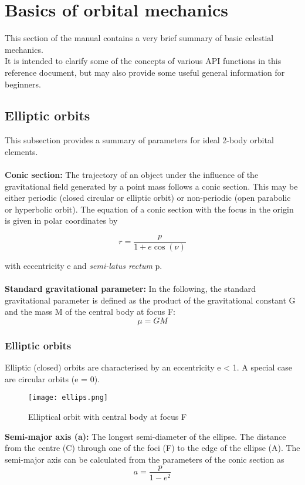 \documentclass[Orbiter Developer Manual.tex]{subfiles}
\begin{document}
\section{Basics of orbital mechanics}
This section of the manual contains a very brief summary of basic celestial mechanics.\\
It is intended to clarify some of the concepts of various API functions in this reference document, but may also provide some useful general information for beginners.


\subsection{Elliptic orbits}%
This subsection provides a summary of parameters for ideal 2-body orbital elements.\\
\\
\textbf{Conic section:} The trajectory of an object under the influence of the gravitational field generated by a point mass follows a conic section. This may be either periodic (closed circular or elliptic orbit) or non-periodic (open parabolic or hyperbolic orbit). The equation of a conic section with the focus in the origin is given in polar coordinates by

\[ r = \frac{p}{1+e \cos(\nu)} \]

\noindent
with eccentricity e and \textit{semi-latus rectum} p.\\
\\
\textbf{Standard gravitational parameter:} In the following, the standard gravitational parameter is defined as the product of the gravitational constant G and the mass M of the central body at focus F:
\[ \mu = GM \]


\subsubsection{Elliptic orbits}%
Elliptic (closed) orbits are characterised by an eccentricity e < 1. A special case are circular orbits (e = 0).

\begin{figure}[H]
  \centering
  \texttt{[image: ellips.png]}
  \caption{Elliptical orbit with central body at focus F}
\end{figure}

\noindent
\textbf{Semi-major axis (a):} The longest semi-diameter of the ellipse. The distance from the centre (C) through one of the foci (F) to the edge of the ellipse (A). The semi-major axis can be calculated from the parameters of the conic section as
\[ a = \frac{p}{1-e^2} \]
\end{document}
